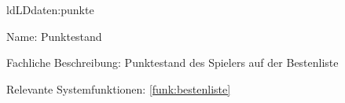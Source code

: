 \begin{description}[leftmargin=5em, style=sameline]
	\begin{lhp}{ld}{LD}{daten:punkte}
		\item [Name:]Punktestand 
		\item [Fachliche Beschreibung:]Punktestand des Spielers auf der Bestenliste
		\item [Relevante Systemfunktionen:] \ref{funk:bestenliste}
	\end{lhp}
	
	\begin{comment}
	\begin{lhp}{ld}{LD}{daten:chips}
		\item [Name:]\textcolor{red}{Chips} 
		\item [Fachliche Beschreibung:]\textcolor{red}{Minuspunkte der Spieler} 
		\item [Relevante Systemfunktionen:] \ref{funk:spielverw}
	\end{lhp}
	\end{comment}
	
	
\end{description}